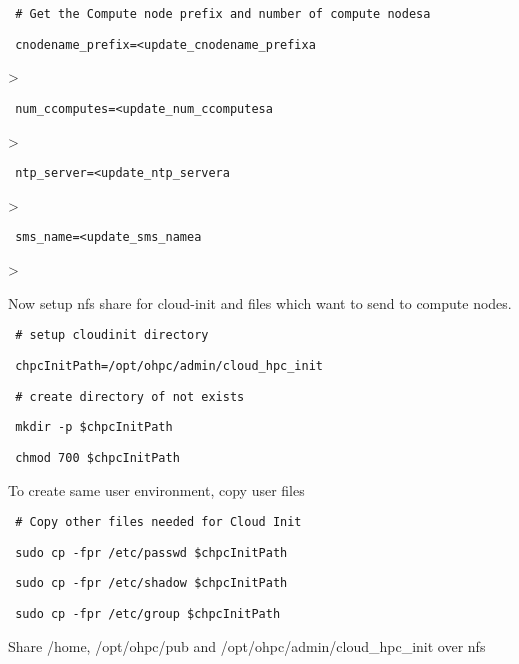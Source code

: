\documentclass[12pt]{article}
\begin{document}
\begin{bash}\texttt{\small{ \# Get the Compute node prefix and number of compute nodesa}}\end{bash}
\begin{bash}\texttt{\small{ cnodename\_prefix=<update\_cnodename\_prefixa}}\end{bash}>
\begin{bash}\texttt{\small{ num\_ccomputes=<update\_num\_ccomputesa}}\end{bash}>
\begin{bash}\texttt{\small{ ntp\_server=<update\_ntp\_servera}}\end{bash}>
\begin{bash}\texttt{\small{ sms\_name=<update\_sms\_namea}}\end{bash}>

Now setup nfs share for cloud-init and files which want to send to compute nodes.

\begin{bash}\texttt{\small{ \# setup cloudinit directory}}\end{bash}
\begin{bash}\texttt{\small{ chpcInitPath=/opt/ohpc/admin/cloud\_hpc\_init}}\end{bash}
\begin{bash}\texttt{\small{ \# create directory of not exists}}\end{bash}
\begin{bash}\texttt{\small{ mkdir -p \$chpcInitPath}}\end{bash}
\begin{bash}\texttt{\small{ chmod 700 \$chpcInitPath}}\end{bash}

To create same user environment, copy user files 

\begin{bash}\texttt{\small{ \# Copy other files needed for Cloud Init}}\end{bash}
\begin{bash}\texttt{\small{ sudo cp -fpr /etc/passwd \$chpcInitPath}}\end{bash}
\begin{bash}\texttt{\small{ sudo cp -fpr /etc/shadow \$chpcInitPath}}\end{bash}
\begin{bash}\texttt{\small{ sudo cp -fpr /etc/group \$chpcInitPath}}\end{bash}

Share /home, /opt/ohpc/pub and /opt/ohpc/admin/cloud\_hpc\_init over nfs
\end{document}
